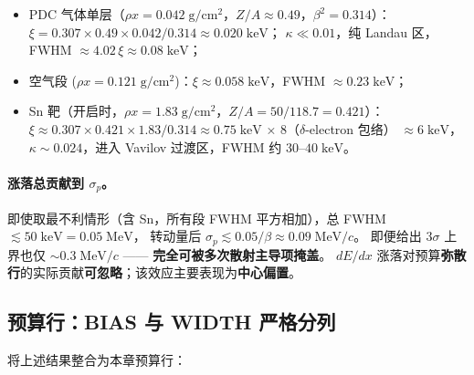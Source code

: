 \begin{itemize}
  \item PDC 气体单层（$\rho x = 0.042\;\mathrm{g/cm^2}$，$Z/A \approx 0.49$，$\beta^2 = 0.314$）：
        $\xi = 0.307 \times 0.49 \times 0.042 / 0.314 \approx 0.020\;\mathrm{keV}$；
        $\kappa \ll 0.01$，纯 Landau 区，FWHM $\approx 4.02\,\xi \approx 0.08\;\mathrm{keV}$；
  \item 空气段 ($\rho x = 0.121\;\mathrm{g/cm^2}$)：$\xi \approx 0.058\;\mathrm{keV}$，FWHM $\approx 0.23\;\mathrm{keV}$；
  \item Sn 靶（开启时，$\rho x = 1.83\;\mathrm{g/cm^2}$，$Z/A = 50/118.7 = 0.421$）：
        $\xi \approx 0.307 \times 0.421 \times 1.83 / 0.314 \approx 0.75\;\mathrm{keV}$ × 8（$\delta$-electron 包络）
        $\approx 6\;\mathrm{keV}$，$\kappa \sim 0.024$，进入 Vavilov 过渡区，FWHM 约 $30\text{--}40\;\mathrm{keV}$。
\end{itemize}

\paragraph{涨落总贡献到 $\sigma_p$。}
即使取最不利情形（含 Sn，所有段 FWHM 平方相加），总 FWHM $\lesssim 50\;\mathrm{keV} = 0.05\;\mathrm{MeV}$，
转动量后 $\sigma_p \lesssim 0.05/\beta \approx 0.09\;\mathrm{MeV}/c$。
即便给出 $3\sigma$ 上界也仅 $\sim 0.3\;\mathrm{MeV}/c$ —— \textbf{完全可被多次散射主导项掩盖}。
$dE/dx$ 涨落对预算\textbf{弥散行}的实际贡献\textbf{可忽略}；该效应主要表现为\textbf{中心偏置}。

\subsection{预算行：BIAS 与 WIDTH 严格分列}
\label{sec:budget-dedx-row}

将上述结果整合为本章预算行：

